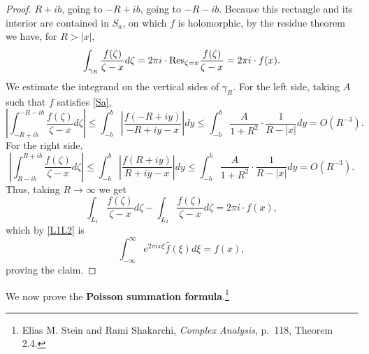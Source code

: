 \documentclass{article}
\newcommand{\Res}{\ensuremath\mathrm{Res}}
\theoremstyle{definition}
\begin{document}
\begin{proof}
$R+ib$, going to $-R+ib$, going to $-R-ib$. Because this rectangle and its interior are contained in $S_a$, on which $f$ is holomorphic,
by the residue theorem we have, for $R>|x|$,
\[
\int_{\gamma_R} \frac{f(\zeta)}{\zeta-x} d\zeta = 2\pi i \cdot \Res_{\zeta=x} \frac{f(\zeta)}{\zeta-x}=
2\pi i \cdot f(x).
\]
We estimate the integrand on the vertical sides of $\gamma_R$. For the left side, taking $A$ such that $f$ satisfies \eqref{Sa},
\[
\left| \int_{-R+ib}^{-R-ib} \frac{f(\zeta)}{\zeta-x} d\zeta \right|
\leq \int_{-b}^b \left| \frac{f(-R+iy)}{-R+iy-x} \right| dy
\leq \int_{-b}^b \frac{A}{1+R^2} \cdot \frac{1}{R-|x|} dy
=O(R^{-3}).
\]
For the right side,
\[
\left| \int_{R-ib}^{R+ib} \frac{f(\zeta)}{\zeta-x} d\zeta \right|
\leq \int_{-b}^b \left| \frac{f(R+iy)}{R+iy-x}\right| dy
\leq \int_{-b}^b \frac{A}{1+R^2} \cdot \frac{1}{R-|x|} dy
=O(R^{-3}).
\]
Thus, taking $R \to \infty$ we get
\[
\int_{L_1} \frac{f(\zeta)}{\zeta-x} d\zeta
-\int_{L_2} \frac{f(\zeta)}{\zeta-x} d\zeta
=2\pi i \cdot f(x),
\]
which by \eqref{L1L2} is
\[
\int_{-\infty}^\infty e^{2\pi ix \xi} \widehat{f}(\xi) d\xi  = f(x),
\]
proving the claim.
\end{proof}


We now prove the \textbf{Poisson summation formula}.\footnote{Elias M. Stein and Rami Shakarchi, {\em Complex Analysis},
p.~118, Theorem 2.4.}
\end{document}
